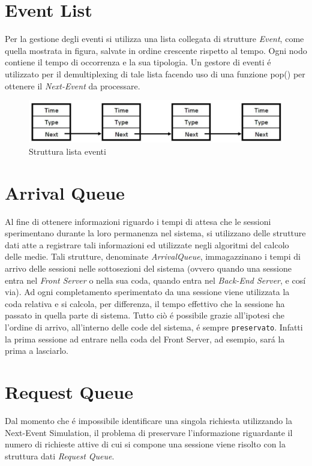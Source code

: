 \section{Event List}
Per la gestione degli eventi si utilizza una lista collegata di strutture \textit{Event}, come quella mostrata in figura, salvate in ordine crescente rispetto al tempo. Ogni nodo contiene il tempo di occorrenza e la sua tipologia. Un gestore di eventi \'e utilizzato per il demultiplexing di tale lista facendo uso di una funzione pop() per ottenere il \textit{Next-Event} da processare.
\begin{figure}[H]
  \centering
  \includegraphics[scale=0.5]{img/EventList.png}
  \caption[EventList]{Struttura lista eventi}
  \label{fig:eventList}
\end{figure}

\section{Arrival Queue}
Al fine di ottenere informazioni riguardo i tempi di attesa che le sessioni sperimentano durante la loro permanenza nel sistema, si utilizzano delle strutture dati atte a registrare tali informazioni ed utilizzate negli algoritmi del calcolo delle medie. Tali strutture, denominate \textit{ArrivalQueue}, immagazzinano i tempi di arrivo delle sessioni nelle sottosezioni del sistema (ovvero quando una sessione entra nel \textit{Front Server} o nella sua coda, quando entra nel \textit{Back-End Server}, e cos\'i via). Ad ogni completamento sperimentato da una sessione viene utilizzata la coda relativa e si calcola, per differenza, il tempo effettivo che la sessione ha passato in quella parte di sistema. Tutto ciò \'e possibile grazie all'ipotesi che l'ordine di arrivo, all'interno delle code del sistema, \'e sempre \texttt{preservato}. Infatti la prima sessione ad entrare nella coda del Front Server, ad esempio, sar\'a la prima a lasciarlo.

\section{Request Queue}
Dal momento che \'e impossibile identificare una singola richiesta utilizzando la Next-Event Simulation, il problema di preservare l'informazione riguardante il numero di richieste attive di cui si compone una sessione viene risolto con la struttura dati \textit{Request Queue}. 

